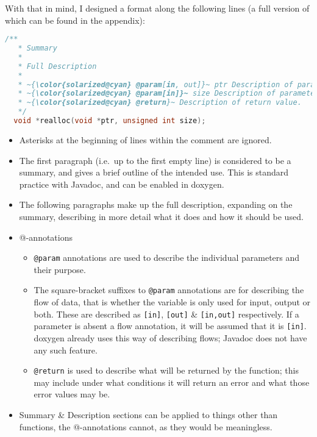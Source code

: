 With that in mind, I designed a format along the following lines (a full version
of which can be found in the appendix):

\begin{lstlisting}[language=c, escapechar=~]
  /**
   * Summary
   *
   * Full Description
   *
   * ~{\color{solarized@cyan} @param[in, out]}~ ptr Description of parameter ptr
   * ~{\color{solarized@cyan} @param[in]}~ size Description of parameter size
   * ~{\color{solarized@cyan} @return}~ Description of return value.
   */
  void *realloc(void *ptr, unsigned int size);
\end{lstlisting}

\begin{itemize}
  \item Asterisks at the beginning of lines within the comment are ignored.
  \item The first paragraph (i.e.~up to the first empty line) is considered to
    be a summary, and gives a brief outline of the intended use. This is
    standard practice with Javadoc, and can be enabled in doxygen.
  \item The following paragraphs make up the full description, expanding on the
    summary, describing in more detail what it does and how it should be used.
  \item @-annotations
    \begin{itemize}
      \item \lstinline|@param| annotations are used to describe the individual
        parameters and their purpose.
      \item The square-bracket suffixes to \lstinline|@param| annotations are
        for describing the flow of data, that is whether the variable is only
        used for input, output or both. These are described as \lstinline|[in]|,
        \lstinline|[out]| \& \lstinline|[in,out]| respectively. If a parameter
        is absent a flow annotation, it will be assumed that it is
        \lstinline|[in]|.
        doxygen already uses this way of describing flows; Javadoc does not have
        any such feature.
      \item \lstinline|@return| is used to describe what will be returned by the
        function; this may include under what conditions it will return an error
        and what those error values may be.
    \end{itemize}
    \item Summary \& Description sections can be applied to things other than
      functions, the @-annotations cannot, as they would be meaningless.
\end{itemize}

